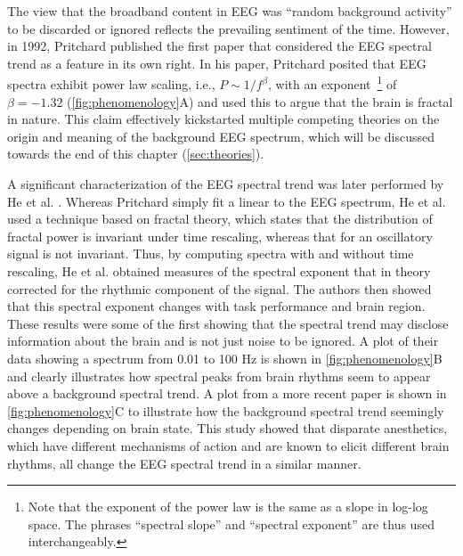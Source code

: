 The view that the broadband content in EEG was ``random background activity'' to be discarded or ignored reflects the prevailing sentiment of the time. However, in 1992, Pritchard \cite{Pritchard1992} published the first paper that considered the EEG spectral trend as a feature in its own right. In his paper, Pritchard posited that EEG spectra exhibit power law scaling, i.e., $P\sim1/f^\beta$, with an exponent~\footnote[3]{Note that the exponent of the power law is the same as a slope in log-log space. The phrases ``spectral slope'' and ``spectral exponent'' are thus used interchangeably.} of $\beta=-1.32$ (\autoref{fig:phenomenology}A) and used this to argue that the brain is fractal in nature. This claim effectively kickstarted multiple competing theories on the origin and meaning of the background EEG spectrum, which will be discussed towards the end of this chapter (\autoref{sec:theories}).

A significant characterization of the EEG spectral trend was later performed by He et al. \cite{He2010}. Whereas Pritchard \cite{Pritchard1992} simply fit a linear to the EEG spectrum, He et al.\cite{He2010} used a technique based on fractal theory, which states that the distribution of fractal power is invariant under time rescaling, whereas that for an oscillatory signal is not invariant. Thus, by computing spectra with and without time rescaling, He et al. \cite{He2010} obtained measures of the spectral exponent that in theory corrected for the rhythmic component of the signal. The authors then showed that this spectral exponent changes with task performance and brain region. These results were some of the first showing that the spectral trend may disclose information about the brain and is not just noise to be ignored. A plot of their data showing a spectrum from 0.01 to 100 \unit{\hertz} is shown in \autoref{fig:phenomenology}B and clearly illustrates how spectral peaks from brain rhythms seem to appear above a background spectral trend. A plot from a more recent paper \cite{Colombo2019} is shown in \autoref{fig:phenomenology}C to illustrate how the background spectral trend seemingly changes depending on brain state. This study showed that disparate anesthetics, which have different mechanisms of action and are known to elicit different brain rhythms, all change the EEG spectral trend in a similar manner.


